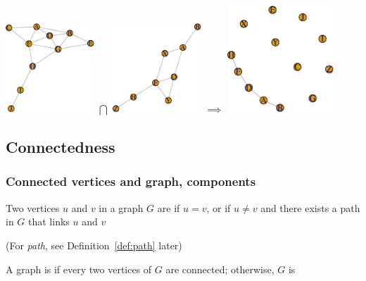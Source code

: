 \documentclass[aspectratio=169]{beamer}\usepackage[]{graphicx}\usepackage[]{xcolor}
\begin{document}
\begin{frame}
\centering
\includegraphics[width=0.25\textwidth]{FIGS/graphs-plot-union-graphs-net1-1.pdf}
$\bigcap$
\includegraphics[width=0.25\textwidth]{FIGS/graphs-plot-union-graphs-net2-1.pdf}
$\implies$
\includegraphics[width=0.3\textwidth]{FIGS/graphs-plot-intersection-graphs-net1Nnet2-1.pdf}
\end{frame}

\subsection{Connectedness}

\begin{frame}\frametitle{Connected vertices and graph, components}
\begin{definition}
Two vertices $u$ and $v$ in a graph $G$ are  if $u=v$, or if $u\not =v$ and there exists a path in $G$ that links $u$ and $v$
\end{definition}
(For \emph{path}, see Definition~\ref{def:path} later)
\vfill
\begin{definition}
A graph is  if every two vertices of $G$ are connected; otherwise, $G$ is 
\end{definition}
\end{frame}
\end{document}
